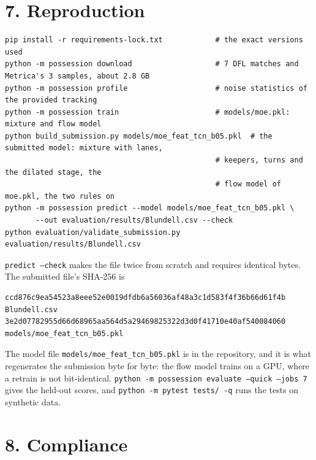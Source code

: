 \documentclass[10pt,a4paper]{article}
\begin{document}
\section*{7. Reproduction}


\begin{Verbatim}[fontsize=\footnotesize,frame=single,framesep=4pt]
pip install -r requirements-lock.txt            # the exact versions used
python -m possession download                   # 7 DFL matches and Metrica's 3 samples, about 2.8 GB
python -m possession profile                    # noise statistics of the provided tracking
python -m possession train                      # models/moe.pkl: mixture and flow model
python build_submission.py models/moe_feat_tcn_b05.pkl  # the submitted model: mixture with lanes,
                                                # keepers, turns and the dilated stage, the
                                                # flow model of moe.pkl, the two rules on
python -m possession predict --model models/moe_feat_tcn_b05.pkl \
       --out evaluation/results/Blundell.csv --check
python evaluation/validate_submission.py evaluation/results/Blundell.csv
\end{Verbatim}


\texttt{predict --check} makes the file twice from scratch and requires identical bytes. The submitted
file's SHA-256 is


\begin{Verbatim}[fontsize=\footnotesize,frame=single,framesep=4pt]
ccd876c9ea54523a8eee52e0019dfdb6a56036af48a3c1d583f4f36b66d61f4b  Blundell.csv
3e2d07782955d66d68965aa564d5a29469825322d3d0f41710e40af540084060  models/moe_feat_tcn_b05.pkl
\end{Verbatim}


The model file
\texttt{models/moe\_feat\_tcn\_b05.pkl} is in the repository, and it is what regenerates the submission byte for
byte: the flow model trains on a GPU, where a retrain is not bit-identical. \texttt{python -m possession
evaluate --quick --jobs 7} gives the held-out scores, and \texttt{python -m pytest tests/ -q} runs the
tests on synthetic data.


\section*{8. Compliance}
\end{document}
